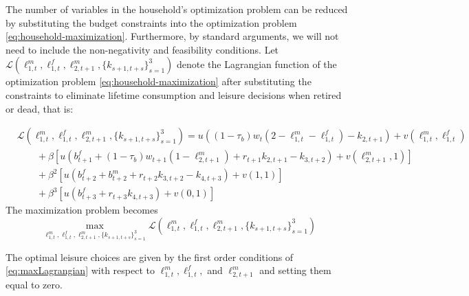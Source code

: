 \documentclass[BufferStockTheory]{subfiles}
\begin{document}
The number of variables in the household's optimization problem  can be reduced by substituting the budget constraints into the optimization problem \eqref{eq:household-maximization}. Furthermore, by standard arguments, we will not need to include the non-negativity and feasibility conditions. Let $\mathcal{L}(\ell_{1,t}^m,\ell_{1,t}^f,\ell_{2,t+1}^m,\{k_{s+1,t+s}\}_{s=1}^3)$ denote the Lagrangian function of the optimization problem \eqref{eq:household-maximization} after substituting the constraints to eliminate lifetime consumption and leisure decisions when retired or dead,  that is:

\begin{equation}
	\label{eq:lagrangian}
	\begin{aligned}
		&\mathcal{L}(\ell_{1,t}^m,\ell_{1,t}^f,\ell_{2,t+1}^m,\{k_{s+1,t+s}\}_{s=1}^3) = u\left((1-\tau_b)w_t (2-\ell_{1,t}^m - \ell_{1,t}^f) -k_{2,t+1}\right) + v(\ell_{1,t}^m,\ell_{1,t}^f)  \\
		&\qquad + \beta \left[ u\left(b_{t+1}^f+(1-\tau_b)w_{t+1} (1-\ell_{2,t+1}^m ) + r_{t+1}k_{2,t+1} -k_{3,t+2}\right) + v(\ell_{2,t+1}^m,1) \right]\\
		&\qquad + \beta^{2} \left[ u\left(b_{t+2}^f+ b_{t+2}^m  + r_{t+2}k_{3,t+2} -k_{4,t+3}\right) + v(1,1) \right]\\
		&\qquad + \beta^{3} \left[ u\left(b_{t+3}^f + r_{t+3}k_{4,t+3}\right) + v(0,1) \right]
	\end{aligned}
	\end{equation}
 The maximization problem becomes 
\begin{equation}
	\label{eq:maxLagrangian}
	\max_{\ell_{1,t}^m,\ell_{1,t}^f,\ell_{2,t+1}^m,\{k_{s+1,t+s}\}_{s=1}^3} \mathcal{L}(\ell_{1,t}^m,\ell_{1,t}^f,\ell_{2,t+1}^m,\{k_{s+1,t+s}\}_{s=1}^3)
\end{equation}

The optimal leisure choices are given by the first order conditions of \eqref{eq:maxLagrangian} with respect to $\ell_{1,t}^m,\ell_{1,t}^f,$ and $\ell_{2,t+1}^m$ and setting them equal to zero. 
\end{document}
